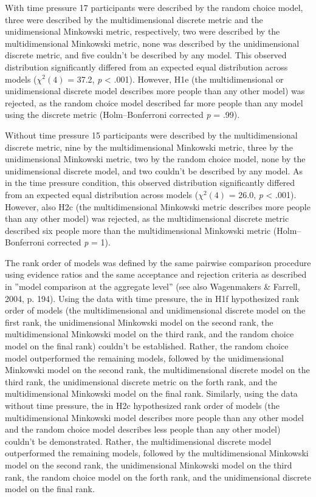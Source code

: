 \documentclass[a4paper,man,natbib]{apa6}
\begin{document}
With time pressure 17 participants were described by the random choice model, three were described by the multidimensional discrete metric and the unidimensional Minkowski metric, respectively, two were described by the multidimensional Minkowski metric, none was described by the unidimensional discrete metric, and five couldn't be described by any model. This observed distribution significantly differed from an expected equal distribution across models ($\chi^{2}(4)$ = 37.2, \textit{p} < .001). However, H1e (the multidimensional or unidimensional discrete model describes more people than any other model) was rejected, as the random choice model described far more people than any model using the discrete metric (Holm--Bonferroni corrected \textit{p} = .99). 

Without time pressure 15 participants were described by the multidimensional discrete metric, nine by the multidimensional Minkowski metric, three by the unidimensional Minkowski metric, two by the random choice model, none by the unidimensional discrete model, and two couldn't be described by any model. As in the time pressure condition, this observed distribution significantly differed from an expected equal distribution across models ($\chi^{2}(4)$ = 26.0, \textit{p} < .001). However, also H2c (the multidimensional Minkowski metric describes more people than any other model) was rejected, as the multidimensional discrete metric described six people more than the multidimensional Minkowski metric (Holm--Bonferroni corrected \textit{p} = 1).

The rank order of models was defined by the same pairwise comparison procedure using evidence ratios and the same acceptance and rejection criteria as described in ''model comparison at the aggregate level'' (see also Wagenmakers \& Farrell, 2004, p. 194). Using the data with time pressure, the in H1f hypothesized rank order of models (the multidimensional and unidimensional discrete model on the first rank, the unidimensional Minkowski model on the second rank, the multidimensional Minkowski model on the third rank, and the random choice model on the final rank) couldn't be established. Rather, the random choice model outperformed the remaining models, followed by the unidimensional Minkowski model on the second rank, the multidimensional discrete model on the third rank, the unidimensional discrete metric on the forth rank, and the multidimensional Minkowski model on the final rank. Similarly, using the data without time pressure, the in H2c hypothesized rank order of models (the multidimensional Minkowski model describes more people than any other model and the random choice model describes less people than any other model) couldn't be demonstrated. Rather, the multidimensional discrete model outperformed the remaining models, followed by the multidimensional Minkowski model on the second rank, the unidimensional Minkowski model on the third rank, the random choice model on the forth rank, and the unidimensional discrete model on the final rank. 
\end{document}
